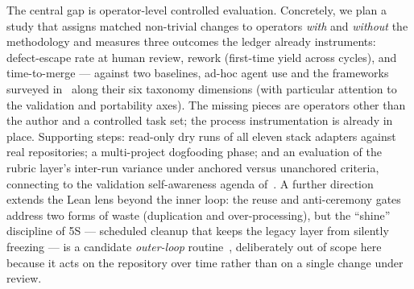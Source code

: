\documentclass[11pt]{article}
\begin{document}
The central gap is operator-level controlled evaluation. Concretely, we plan a study that
assigns matched non-trivial changes to operators \emph{with} and \emph{without}
the methodology and measures three outcomes the ledger already instruments:
defect-escape rate at human review, rework (first-time yield across cycles),
and time-to-merge --- against two baselines, ad-hoc agent use and the
frameworks surveyed in~\cite{demacedo2026prompt} along their six taxonomy
dimensions (with particular attention to the validation and portability axes).
The missing pieces are operators other than the author and a controlled task
set; the process instrumentation is already in place. Supporting steps:
read-only dry runs of all eleven stack adapters against real repositories; a
multi-project dogfooding phase; and an evaluation of the rubric layer's
inter-run variance under anchored versus unanchored criteria, connecting to the
validation self-awareness agenda of~\cite{ma2026building}. A further direction extends the Lean lens beyond the
inner loop: the reuse and anti-ceremony gates address two forms of waste
(duplication and over-processing), but the ``shine'' discipline of 5S ---
scheduled cleanup that keeps the legacy layer from silently freezing --- is a
candidate \emph{outer-loop} routine~\cite{poppendieck2006lean}, deliberately
out of scope here because it acts on the repository over time rather than on a
single change under review.
\end{document}
